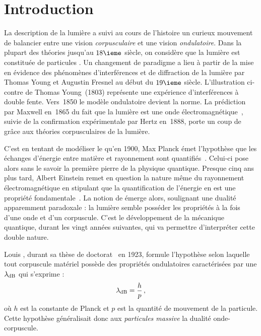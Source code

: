 \NumberThisInToc
\chapter*{Introduction}


{

La description de la lumière a suivi au cours de l'histoire un curieux mouvement de balancier entre une vision \emph{corpusculaire} et une vision \emph{ondulatoire}. Dans la plupart des théories jusqu'au $18\ieme$ siècle, on considère que la lumière est constituée de particules%
. 
Un changement de paradigme a lieu à partir de la mise en évidence des phénomènes d'interférences et de diffraction de la lumière par Thomas Young et Augustin Fresnel au début du $19\ieme$ siècle. L'illustration ci-contre de Thomas Young~(1803) représente une expérience d'interférences à double fente. Vers~1850 le modèle ondulatoire devient la norme. La prédiction par Maxwell en~1865 du fait que la lumière est une onde électromagnétique~\cite{Max65}, suivie de la confirmation expérimentale par Hertz en~1888, porte un coup de grâce aux théories corpusculaires de la lumière.

}

\vspace{1ex}
C'est en tentant de modéliser le  qu'en 1900, Max Planck émet l'hypothèse que les échanges d'énergie entre matière et rayonnement sont quantifiés~\cite{Pla01}. Celui-ci pose alors sans le savoir la première pierre de la physique quantique. Presque cinq ans plus tard, Albert Einstein remet en question la nature même du rayonnement électromagnétique en stipulant que la quantification de l'énergie en est une propriété fondamentale~\cite{Ein05}. La notion de  émerge alors, soulignant une dualité apparemment paradoxale : la lumière semble posséder les propriétés à la fois d'une onde et d'un corpuscule.
C'est le développement de la mécanique quantique, durant les vingt années suivantes, qui va permettre d'interpréter cette double nature.


Louis \dB, durant sa thèse de doctorat~\cite{Bro24} en 1923, formule l'hypothèse selon laquelle 
tout corpuscule matériel possède des propriétés ondulatoires caractérisées par une \lo ${\lambda_{\rm dB}}$ qui s'exprime :
\[
{\lambda_{\rm dB}} = \frac{h}{p}
\, ,
\]
où $h$ est la constante de Planck et $p$ est la quantité de mouvement de la particule. Cette hypothèse généralisait donc aux \emph{particules massive} la dualité onde-corpuscule.

